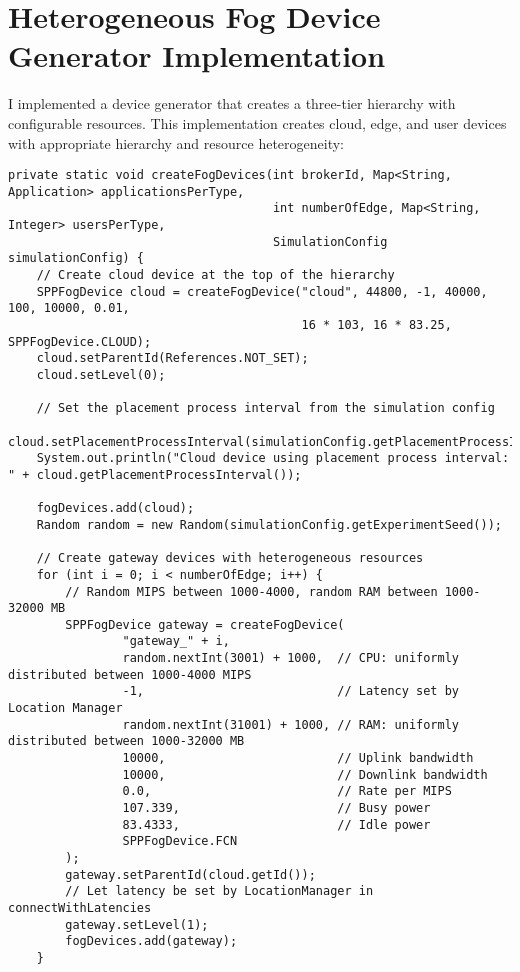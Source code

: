 \chapter{Heterogeneous Fog Device Generator Implementation}
\label{appendix:device-generator}

I implemented a device generator that creates a three-tier hierarchy with configurable resources. This implementation creates cloud, edge, and user devices with appropriate hierarchy and resource heterogeneity:

\begin{verbatim}
private static void createFogDevices(int brokerId, Map<String, Application> applicationsPerType,
                                     int numberOfEdge, Map<String, Integer> usersPerType, 
                                     SimulationConfig simulationConfig) {
    // Create cloud device at the top of the hierarchy
    SPPFogDevice cloud = createFogDevice("cloud", 44800, -1, 40000, 100, 10000, 0.01, 
                                         16 * 103, 16 * 83.25, SPPFogDevice.CLOUD);
    cloud.setParentId(References.NOT_SET);
    cloud.setLevel(0);
    
    // Set the placement process interval from the simulation config
    cloud.setPlacementProcessInterval(simulationConfig.getPlacementProcessInterval());
    System.out.println("Cloud device using placement process interval: " + cloud.getPlacementProcessInterval());
    
    fogDevices.add(cloud);
    Random random = new Random(simulationConfig.getExperimentSeed());

    // Create gateway devices with heterogeneous resources
    for (int i = 0; i < numberOfEdge; i++) {
        // Random MIPS between 1000-4000, random RAM between 1000-32000 MB
        SPPFogDevice gateway = createFogDevice(
                "gateway_" + i,
                random.nextInt(3001) + 1000,  // CPU: uniformly distributed between 1000-4000 MIPS
                -1,                           // Latency set by Location Manager
                random.nextInt(31001) + 1000, // RAM: uniformly distributed between 1000-32000 MB
                10000,                        // Uplink bandwidth
                10000,                        // Downlink bandwidth
                0.0,                          // Rate per MIPS
                107.339,                      // Busy power
                83.4333,                      // Idle power
                SPPFogDevice.FCN
        );
        gateway.setParentId(cloud.getId());
        // Let latency be set by LocationManager in connectWithLatencies
        gateway.setLevel(1);
        fogDevices.add(gateway);
    }


\end{verbatim}
